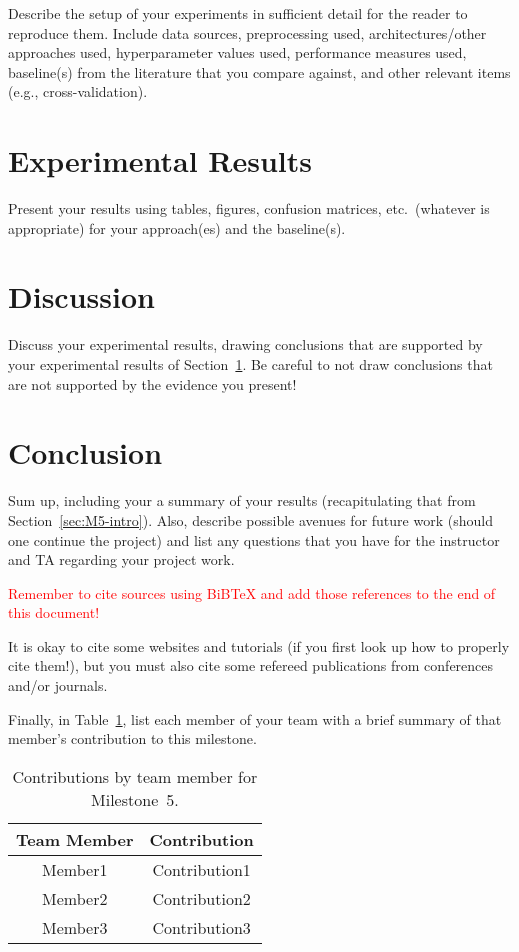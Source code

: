\documentclass{report}
\begin{document}
Describe the setup of your experiments  in sufficient detail for the reader to reproduce them.  Include data sources, preprocessing used, architectures/other approaches used, hyperparameter values used, performance measures used, baseline(s) from the literature that you compare against, and other relevant items (e.g., cross-validation).

\section{Experimental Results}
\label{sec:M5-results}

Present your results  using tables, figures, confusion matrices, etc.\ (whatever is appropriate) for your approach(es) and the baseline(s). 

\section{Discussion}

Discuss your experimental results, drawing conclusions that are supported by your experimental results of Section~\ref{sec:M5-results}.   Be careful to not draw conclusions that are not supported by the evidence you present!

\section{Conclusion}

Sum up, including your a summary of your results  (recapitulating that from Section~\ref{sec:M5-intro}).  Also, describe possible avenues for future work (should one continue the project) and list any questions that you have for the instructor and TA regarding your project work.

\textcolor{red}{Remember to cite sources using BiBTeX and add those references to the end of this document!}

It is okay to cite some websites and tutorials (if you first look up how to properly cite them!), but you must also cite some refereed publications from conferences and/or journals.

Finally, in Table~\ref{tab:contribution5}, list each member of your team with a brief summary of that member's contribution to this milestone.

\begin{table}[]
    \caption{Contributions by team member for Milestone~5.}
    \centering
    \begin{tabular}{|c|c|} \hline
    {\bf Team Member}     &  {\bf Contribution}  \\ \hline
    Member1     &  Contribution1 \\
    Member2     &  Contribution2 \\
    Member3     &  Contribution3 \\ \hline
    \end{tabular}
    \label{tab:contribution5}
\end{table}
\end{document}
